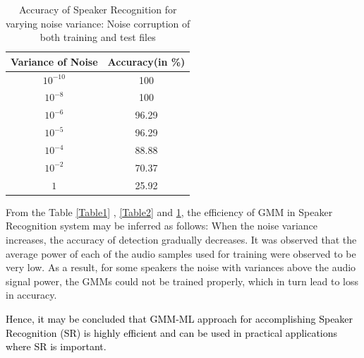 \documentclass{article}
\begin{document}
{\begin{table}[!h]
\centering
\begin{tabular}{|c|c|}
\hline
\multicolumn{1}{|l|}{Variance of Noise} & \multicolumn{1}{l|}{Accuracy(in \%)} \\ \hline
$10^{-10}$               & 100                                 \\ \hline
$10^{-8}$                & 100                               \\ \hline
$10^{-6}$                & 96.29                               \\ \hline
$10^{-5}$                & 96.29                               \\ \hline
$10^{-4}$                & 88.88                               \\ \hline
$10^{-2}$                & 70.37                               \\ \hline
$1$                       & 25.92                              \\ \hline
\end{tabular}
\caption{Accuracy of Speaker Recognition for varying noise variance: Noise corruption of both training and test files}
\label{Table3}
\end{table}


From the Table \ref{Table1} , \ref{Table2} and \ref{Table3}, the efficiency of GMM in Speaker Recognition system may be inferred as follows: When the noise variance increases, the accuracy of detection gradually decreases. %
It was observed that the average power of each of the audio samples used for training were observed to be very low. As a result, for some speakers the noise with variances above the audio signal power, the GMMs could not be trained properly, which in turn lead to loss in accuracy. %

\textcolor{black}{
Hence, it may be concluded that GMM-ML approach for accomplishing Speaker Recognition (SR) is highly efficient and can be used in practical applications where SR is important.}

}
\end{document}
